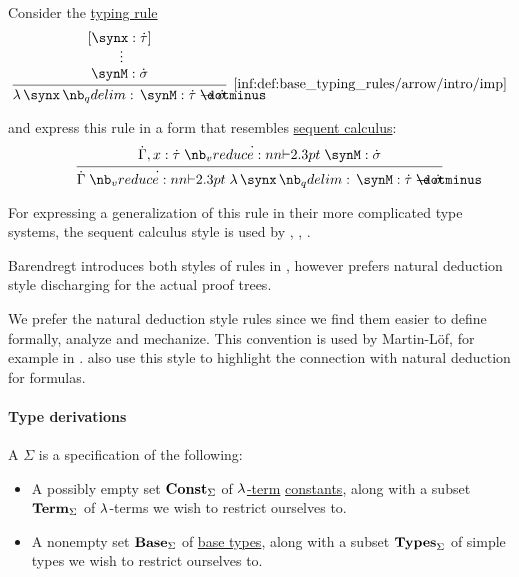 \begin{remark}\label{rem:typing_rule_style}
  Consider the \hyperref[def:simple_typing_rule]{typing rule}
  \begin{equation*}
    \begin{prooftree}
      \hypo{ [\synx: \syn\tau] }
      \ellipsis {} { \synM: \syn\sigma }
      \infer1[\ref{inf:def:base_typing_rules/arrow/intro/imp}]{ \qabs \synx \synM: \syn\tau \synimplies \syn\sigma }
    \end{prooftree}
  \end{equation*}

   and  express this rule in a form that resembles \hyperref[rem:sequent_calculus]{sequent calculus}:
  \begin{equation*}
    \begin{prooftree}
      \hypo{ \syn\Gamma, x: \syn\tau \synvdash \synM: \syn\sigma }
      \infer1{ \syn\Gamma \synvdash \qabs \synx \synM: \syn\tau \synimplies \syn\sigma }
    \end{prooftree}
  \end{equation*}

  For expressing a generalization of this rule in their more complicated type systems, the sequent calculus style is used by , , .

  Barendregt introduces both styles of rules in \cite[def. 3.1.3]{Barendregt1992Types}, however prefers natural deduction style discharging for the actual proof trees.

  We prefer the natural deduction style rules since we find them easier to define formally, analyze and mechanize. This convention is used by Martin-L\"of, for example in \cite{MartinLöf1984IntTypeTheory}.  also use this style to highlight the connection with natural deduction for formulas.
\end{remark}

\paragraph{Type derivations}

\begin{definition}\label{def:simple_type_signature}\mimprovised
  A  \( \Sigma \) is a specification of the following:
  \begin{itemize}
    \item A possibly empty set \( \op*{Const}_\Sigma \) of \hyperref[def:lambda_term]{\( \mathrm{\lambda} \)-term} \hyperref[def:lambda_term/const]{constants}, along with a subset \( \op*{Term}_\Sigma \) of \( \mathrm{\lambda} \)-terms we wish to restrict ourselves to.

    \item A nonempty set \( \op*{Base}_\Sigma \) of \hyperref[def:simple_type]{base types}, along with a subset \( \op*{Types}_\Sigma \) of simple types we wish to restrict ourselves to.
  \end{itemize}
\end{definition}

